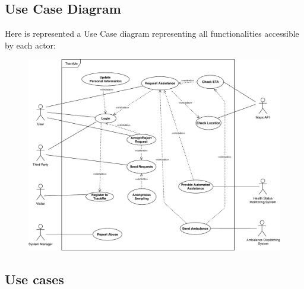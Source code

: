 \documentclass[12pt,a4paper]{article}
\begin{document}
	\newpage
	\subsection{Use Case Diagram}
	Here is represented a Use Case diagram representing all functionalities accessible by each actor:
	\begin{figure}[h]
		\centering
		\includegraphics[width=1.25\linewidth]{Images/use_case_diagram}
		\label{fig:use_case_diagram}
	\end{figure}

	\newpage
	\subsection{Use cases}
\end{document}
